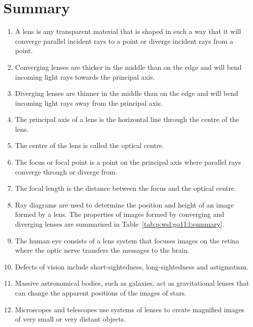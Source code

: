 \section{Summary}
\begin{enumerate} 
\item A lens is any transparent material that is shaped in such a way that it will converge parallel incident rays to a point or diverge incident rays from a point. 
\item Converging lenses are thicker in the middle than on the edge and will bend incoming light rays towards the principal axis. 
\item Diverging lenses are thinner in the middle than on the edge and will bend incoming light rays away from the principal axis. 
\item The principal axis of a lens is the horizontal line through the centre of the lens. 
\item The centre of the lens is called the optical centre. 
\item The focus or focal point is a point on the principal axis where parallel rays converge through or diverge from. 
\item The focal length is the distance between the focus and the optical centre. 
\item Ray diagrams are used to determine the position and height of an image formed by a lens. The properties of images formed by converging and diverging lenses are summarised in Table~\ref{tab:p:wsl:go11:l:summary}. 
\item The human eye consists of a lens system that focuses images on the retina where the optic nerve transfers the messages to the brain. 
\item Defects of vision include short-sightedness, long-sightedness and astigmatism. 
\item Massive astronomical bodies, such as galaxies, act as gravitational lenses that can change the apparent positions of the images of stars. 
\item Microscopes and telescopes use systems of lenses to create magnified images of very small or very distant objects. 
\end{enumerate}



